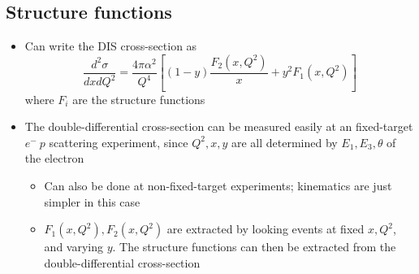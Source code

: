 \documentclass[11pt]{article}
\newcommand{\dd}[2]{\dfrac{d #1}{d #2}}
\newcommand{\el}{\ensuremath{e^{-}}}
\begin{document}
\subsection{Structure functions}
\begin{itemize}
  \item Can write the DIS cross-section as
  \begin{equation}
    \dd{^2\sigma}{xdQ^2} = \frac{4\pi\alpha^2}{Q^4} \left[(1-y)\frac{F_2(x,Q^2)}{x}+y^2F_1(x,Q^2)\right]
  \end{equation}
  where $F_i$ are the structure functions
  \item The double-differential cross-section can be measured easily at an fixed-target $\el~p$ scattering experiment, since $Q^2,x,y$ are all determined by $E_1, E_3,\theta$ of the electron 
  \begin{itemize}
    \item Can also be done at non-fixed-target experiments; kinematics are just simpler in this case
    \item $F_1(x,Q^2),F_2(x,Q^2)$ are extracted by looking events at fixed $x,Q^2$, and varying $y$. The structure functions can then be extracted from the double-differential cross-section
  \end{itemize}
\end{itemize}
\end{document}
